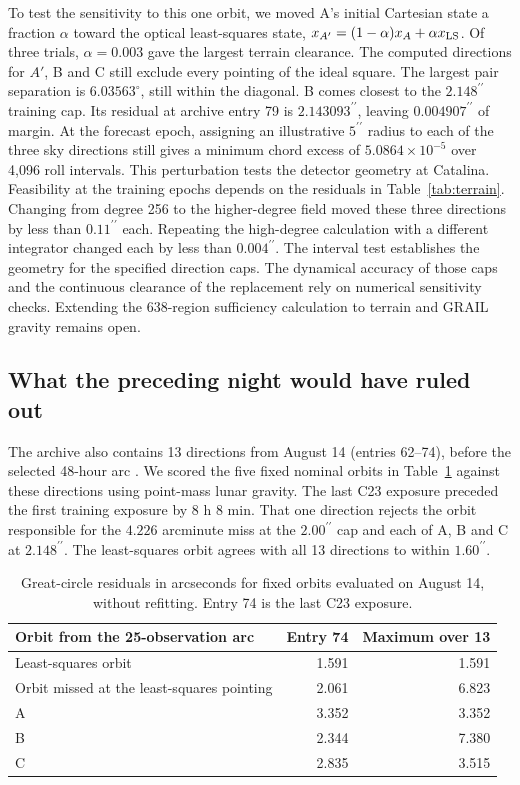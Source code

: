 \documentclass[10pt,letterpaper]{article}
\newcommand{\degc}{^{\circ}}
\newcommand{\as}{^{\prime\prime}}
\begin{document}
To test the sensitivity to this one orbit, we moved A's initial Cartesian state a fraction $\alpha$ toward the optical least-squares state, $x_{A'}=(1-\alpha)x_A+\alpha x_{\rm LS}$. Of three trials, $\alpha=0.003$ gave the largest terrain clearance. The computed directions for $A'$, B and C still exclude every pointing of the ideal square. The largest pair separation is $6.03563\degc$, still within the diagonal. B comes closest to the $2.148\as$ training cap. Its residual at archive entry 79 is $2.143093\as$, leaving $0.004907\as$ of margin. At the forecast epoch, assigning an illustrative $5\as$ radius to each of the three sky directions still gives a minimum chord excess of $5.0864\times10^{-5}$ over 4,096 roll intervals. This perturbation tests the detector geometry at Catalina. Feasibility at the training epochs depends on the residuals in Table~\ref{tab:terrain}. Changing from degree 256 to the higher-degree field moved these three directions by less than $0.11\as$ each. Repeating the high-degree calculation with a different integrator changed each by less than $0.004\as$. The interval test establishes the geometry for the specified direction caps. The dynamical accuracy of those caps and the continuous clearance of the replacement rely on numerical sensitivity checks. Extending the 638-region sufficiency calculation to terrain and GRAIL gravity remains open.

\subsection{What the preceding night would have ruled out}\label{sec:earlier}
The archive also contains 13 directions from August 14 (entries 62--74), before the selected 48-hour arc \cite{astrometry}. We scored the five fixed nominal orbits in Table~\ref{tab:earlier} against these directions using point-mass lunar gravity. The last C23 exposure preceded the first training exposure by 8 h 8 min. That one direction rejects the orbit responsible for the $4.226$ arcminute miss at the $2.00\as$ cap and each of A, B and C at $2.148\as$. The least-squares orbit agrees with all 13 directions to within $1.60\as$.

\begin{table}[htbp]
\centering
\caption{Great-circle residuals in arcseconds for fixed orbits evaluated on August 14, without refitting. Entry 74 is the last C23 exposure.}\label{tab:earlier}
\begin{tabular}{lrr}
\toprule
Orbit from the 25-observation arc & Entry 74 & Maximum over 13\\
\midrule
Least-squares orbit & 1.591 & 1.591\\
Orbit missed at the least-squares pointing & 2.061 & 6.823\\
A & 3.352 & 3.352\\
B & 2.344 & 7.380\\
C & 2.835 & 3.515\\
\bottomrule
\end{tabular}
\end{table}
\end{document}
